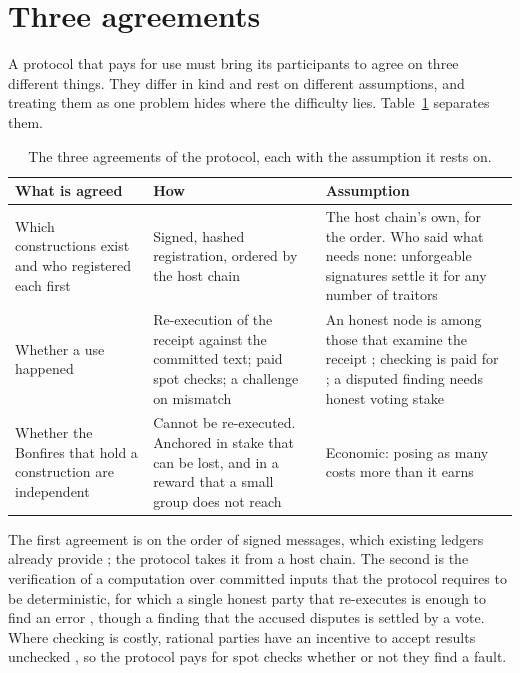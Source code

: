 \section{Three agreements}\label{sec:agreements}

A protocol that pays for use must bring its participants to agree on three different things. They differ in kind
and rest on different assumptions, and treating them as one problem hides where the difficulty lies.
Table~\ref{tab:agreements} separates them.

\begin{table}[!htb]
\centering\small
\begin{tabularx}{\textwidth}{@{}p{}XX@{}}
\toprule
\textbf{What is agreed} & \textbf{How} & \textbf{Assumption} \\
\midrule
Which constructions exist and who registered each first &
Signed, hashed registration, ordered by the host chain &
The host chain's own, for the order. Who said what needs none: unforgeable signatures settle it for any number of
traitors \citep{lamport1982byzantine} \\
\addlinespace
Whether a use happened &
Re-execution of the receipt against the committed text; paid spot checks; a challenge on mismatch &
An honest node is among those that examine the receipt \citep{canetti2011delegation}; checking is paid for
\citep{luu2015verifier}; a disputed finding needs honest voting stake \\
\addlinespace
Whether the Bonfires that hold a construction are independent &
Cannot be re-executed. Anchored in stake that can be lost, and in a reward that a small group does not reach &
Economic: posing as many costs more than it earns \\
\bottomrule
\end{tabularx}
\caption{The three agreements of the protocol, each with the assumption it rests on.}\label{tab:agreements}
\end{table}

The first agreement is on the order of signed messages, which existing ledgers already provide
\citep{nakamoto2008bitcoin}; the protocol takes it from a host chain. The second is the verification of a computation over committed inputs that the protocol requires to be
deterministic, for which a single honest party that re-executes is enough to find
an error \citep{canetti2011delegation}, though a finding that the accused disputes is settled by a vote. Where
checking is costly, rational parties have an incentive to accept results unchecked \citep{luu2015verifier}, so the
protocol pays for spot checks whether or not they find a fault.

